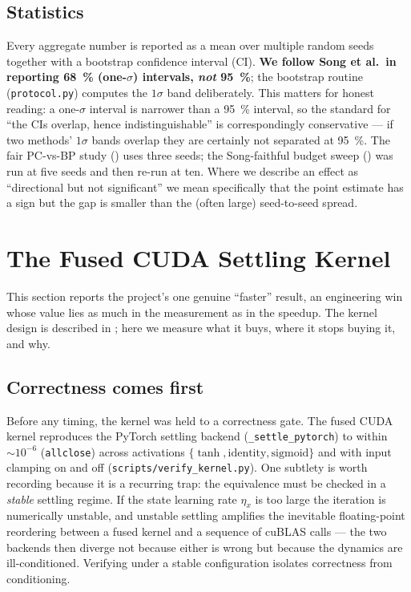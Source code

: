 \subsection{Statistics}

Every aggregate number is reported as a mean over multiple random seeds together with a bootstrap
confidence interval (CI). \textbf{We follow Song et al.\ in reporting \SI{68}{\percent}
(one-\(\sigma\)) intervals, \emph{not} \SI{95}{\percent}}; the bootstrap routine
(\texttt{protocol.py}) computes the \(1\sigma\) band deliberately. This matters for honest
reading: a one-\(\sigma\) interval is narrower than a \SI{95}{\percent} interval, so the standard
for ``the CIs overlap, hence indistinguishable'' is correspondingly conservative --- if two
methods' \(1\sigma\) bands overlap they are certainly not separated at \SI{95}{\percent}. The fair
PC-vs-BP study () uses three seeds; the Song-faithful budget sweep
() was run at five seeds and then re-run at ten. Where we describe an effect as
``directional but not significant'' we mean specifically that the point estimate has a sign but
the gap is smaller than the (often large) seed-to-seed spread.

\section{The Fused CUDA Settling Kernel}\label{sec:exp-kernel}

This section reports the project's one genuine ``faster'' result, an engineering win whose value
lies as much in the measurement as in the speedup. The kernel design is described in
; here we measure what it buys, where it stops buying it, and why.

\subsection{Correctness comes first}

Before any timing, the kernel was held to a correctness gate. The fused CUDA kernel reproduces the
PyTorch settling backend (\texttt{\_settle\_pytorch}) to within \(\sim\!10^{-6}\)
(\texttt{allclose}) across activations \(\{\tanh,\text{identity},\text{sigmoid}\}\) and with input
clamping on and off (\texttt{scripts/verify\_kernel.py}). One subtlety is worth recording because
it is a recurring trap: the equivalence must be checked in a \emph{stable} settling regime. If the
state learning rate \(\eta_x\) is too large the iteration is numerically unstable, and unstable
settling amplifies the inevitable floating-point reordering between a fused kernel and a sequence
of cuBLAS calls --- the two backends then diverge not because either is wrong but because the
dynamics are ill-conditioned. Verifying under a stable configuration isolates correctness from
conditioning.

